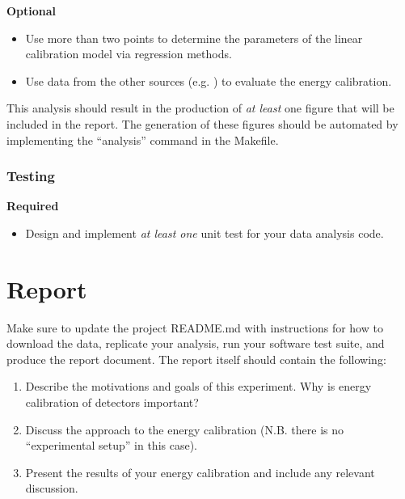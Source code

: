 \documentclass[11pt]{article}
\begin{document}
{\bf Optional}
\begin{itemize}
  \item Use more than two points to determine the parameters of the linear
        calibration model via regression methods.
  \item Use data from the other sources (e.g. ) to evaluate the
        energy calibration.
\end{itemize}

This analysis should result in the production of \textit{at least} one figure
that will be included in the report.
The generation of these figures should be automated by implementing the 
``analysis'' command in the Makefile.

\subsubsection*{Testing}

{\bf Required}
\begin{itemize}
  \item Design and implement \textit{at least one} unit test for your data
        analysis code.
\end{itemize}

\section*{Report}

Make sure to update the project README.md with instructions for how to 
download the data, replicate your analysis, run your software test suite, and
produce the report document.
The report itself should contain the following:

\begin{enumerate}
  \item Describe the motivations and goals of this experiment. Why is energy
        calibration of detectors important?
  \item Discuss the approach to the energy calibration (N.B. there is no
        ``experimental setup'' in this case).
  \item Present the results of your energy calibration and include any
        relevant discussion.
\end{enumerate}

%
\end{document}
